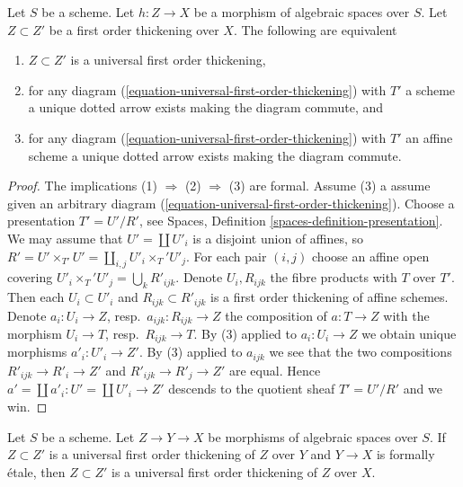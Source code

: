 \begin{lemma}
\label{lemma-check-universal-first-order-thickening}
Let $S$ be a scheme.
Let $h : Z \to X$ be a morphism of algebraic spaces over $S$.
Let $Z \subset Z'$ be a first order thickening over $X$.
The following are equivalent
\begin{enumerate}
\item $Z \subset Z'$ is a universal first order thickening,
\item for any diagram (\ref{equation-universal-first-order-thickening})
with $T'$ a scheme a unique dotted arrow exists making the diagram commute, and
\item for any diagram (\ref{equation-universal-first-order-thickening})
with $T'$ an affine scheme a unique dotted arrow exists making the
diagram commute.
\end{enumerate}
\end{lemma}

\begin{proof}
The implications (1) $\Rightarrow$ (2) $\Rightarrow$ (3) are formal.
Assume (3) a assume given an arbitrary diagram
(\ref{equation-universal-first-order-thickening}).
Choose a presentation $T' = U'/R'$, see
Spaces, Definition \ref{spaces-definition-presentation}.
We may assume that $U' = \coprod U'_i$ is a disjoint union
of affines, so $R' = U' \times_{T'} U' = \coprod_{i, j} U'_i \times_T' U'_j$.
For each pair $(i, j)$ choose an affine open covering
$U'_i \times_T' U'_j = \bigcup_k R'_{ijk}$. Denote $U_i, R_{ijk}$
the fibre products with $T$ over $T'$. Then each
$U_i \subset U'_i$ and $R_{ijk} \subset R'_{ijk}$
is a first order thickening of affine schemes.
Denote $a_i : U_i \to Z$, resp.\ $a_{ijk} : R_{ijk} \to Z$
the composition of $a : T \to Z$ with the morphism
$U_i \to T$, resp.\ $R_{ijk} \to T$.
By (3) applied to $a_i : U_i \to Z$
we obtain unique morphisms $a'_i : U'_i \to Z'$.
By (3) applied to $a_{ijk}$ we see that the two compositions
$R'_{ijk} \to R'_i \to Z'$ and $R'_{ijk} \to R'_j \to Z'$
are equal. Hence $a' = \coprod a'_i : U' = \coprod U'_i \to Z'$
descends to the quotient sheaf $T' = U'/R'$ and we win.
\end{proof}

\begin{lemma}
\label{lemma-universal-thickening-over-formally-etale}
Let $S$ be a scheme.
Let $Z \to Y \to X$ be morphisms of algebraic spaces over $S$.
If $Z \subset Z'$ is a universal first order thickening of
$Z$ over $Y$ and $Y \to X$ is formally \'etale, then $Z \subset Z'$ is
a universal first order thickening of $Z$ over $X$.
\end{lemma}

